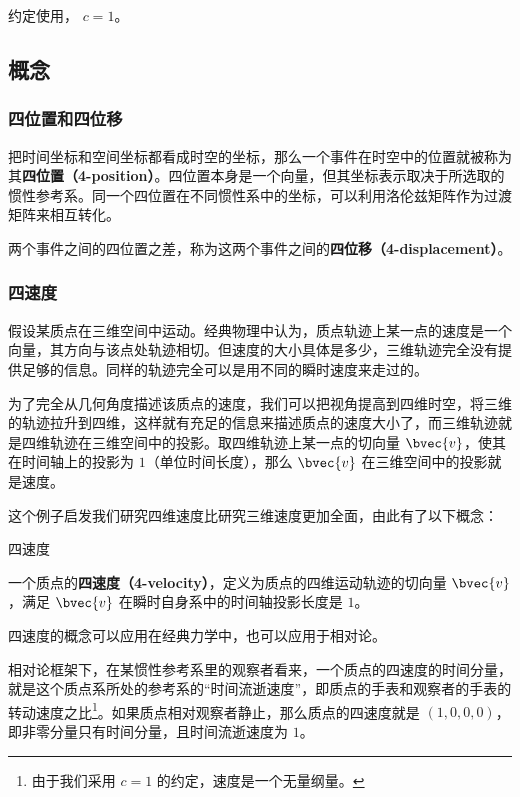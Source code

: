 

约定使用， $c=1$。

\subsection{概念}
\subsubsection{四位置和四位移}
把时间坐标和空间坐标都看成时空的坐标，那么一个事件在时空中的位置就被称为其\textbf{四位置（4-position）}。四位置本身是一个向量，但其坐标表示取决于所选取的惯性参考系。同一个四位置在不同惯性系中的坐标，可以利用洛伦兹矩阵作为过渡矩阵来相互转化。

两个事件之间的四位置之差，称为这两个事件之间的\textbf{四位移（4-displacement）}。

\subsubsection{四速度}

假设某质点在三维空间中运动。经典物理中认为，质点轨迹上某一点的速度是一个向量，其方向与该点处轨迹相切。但速度的大小具体是多少，三维轨迹完全没有提供足够的信息。同样的轨迹完全可以是用不同的瞬时速度来走过的。

为了完全从几何角度描述该质点的速度，我们可以把视角提高到四维时空，将三维的轨迹拉升到四维，这样就有充足的信息来描述质点的速度大小了，而三维轨迹就是四维轨迹在三维空间中的投影。取四维轨迹上某一点的切向量 $\bvec{v}$，使其在时间轴上的投影为 $1$（单位时间长度），那么 $\bvec{v}$ 在三维空间中的投影就是速度。

这个例子启发我们研究四维速度比研究三维速度更加全面，由此有了以下概念：

\begin{definition}{四速度}

一个质点的\textbf{四速度（4-velocity）}，定义为质点的四维运动轨迹的切向量 $\bvec{v}$，满足 $\bvec{v}$ 在瞬时自身系中的时间轴投影长度是 $1$。 

\end{definition}

四速度的概念可以应用在经典力学中，也可以应用于相对论。

相对论框架下，在某惯性参考系里的观察者看来，一个质点的四速度的时间分量，就是这个质点系所处的参考系的“时间流逝速度”，即质点的手表和观察者的手表的转动速度之比\footnote{由于我们采用 $c=1$ 的约定，速度是一个无量纲量。}。如果质点相对观察者静止，那么质点的四速度就是 $(1,0,0,0)$，即非零分量只有时间分量，且时间流逝速度为 $1$。

